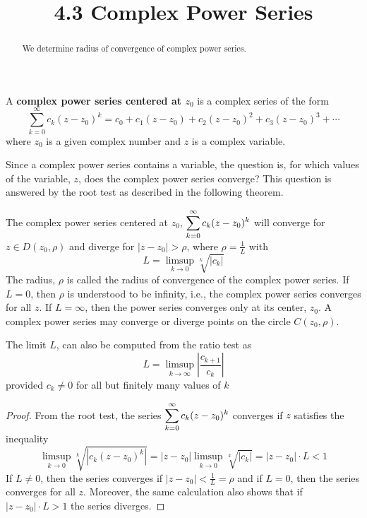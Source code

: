 \documentclass[handout]{ximera}
\title{4.3 Complex Power Series}
\begin{document}
\begin{abstract}
We determine radius of convergence of complex power series.
\end{abstract}

\maketitle


\begin{definition} 
A {\bf complex power series centered at $z_0$} is a complex series of the form
\[
\sum_{k=0}^\infty c_k(z-z_0)^k = c_0 + c_1 (z-z_0) + c_2 (z-z_0)^2 + c_3 (z-z_0)^3 + \cdots
\]
where $z_0$ is a given complex number and $z$ is a complex variable.
\end{definition}
Since a complex power series contains a variable, the question is, for which values of the variable, $z$, 
does the complex power series converge? This question is answered by the root test as described in the following theorem.

\begin{theorem}
The complex power series centered at $z_0$, $\displaystyle \sum_{k=0}^\infty c_k(z-z_0)^k$ will converge for 
$z \in D(z_0, \rho)$ and diverge for $|z-z_0| > \rho$, where $\rho = \frac{1}{L}$ with 
\[
L = \limsup_{k \to 0} \sqrt[k]{|c_k|}
\]
The radius, $\rho$ is called the radius of convergence of the complex power series.
If $L = 0$, then $\rho$ is understood to be infinity, i.e., the complex power series converges for all $z$.
If $L = \infty$, then the power series converges only at its center, $z_0$.
A complex power series may converge or diverge points on the circle $C(z_0, \rho)$.
\end{theorem}
\begin{remark}
The limit $L$, can also be computed from the ratio test as 
\[
L = \limsup_{k \to \infty} \left|\frac{c_{k+1}}{c_k}\right|
\]
provided $c_k \neq 0$ for all but finitely many values of $k$
\end{remark}


\begin{proof}
From the root test, the series  $\displaystyle \sum_{k=0}^\infty c_k(z-z_0)^k$ converges if $z$ satisfies the inequality
\[
\limsup_{k \to 0} \sqrt[k]{|c_k(z-z_0)^k|} = |z-z_0| \limsup_{k \to 0} \sqrt[k]{|c_k|} = |z-z_0| \cdot L < 1
\]
If $L \neq 0$, then the series converges if $|z-z_0| < \frac{1}{L} = \rho$ and if $L =0$, then the series converges for all $z$.
Moreover, the same calculation also shows that if $|z-z_0| \cdot L > 1$ the series diverges.
\end{proof}
\end{document}
